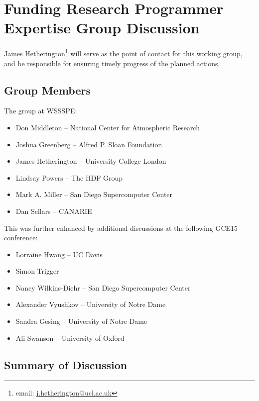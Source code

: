 \section{Funding Research Programmer Expertise Group Discussion}
\label{sec:appendix_funding_spec_expert}

James Hetherington\footnote{email:
\href{mailto:j.hetherington@ucl.ac.uk}{j.hetherington@ucl.ac.uk}} will serve as
the point of contact for this working group, and be responsible for ensuring
timely progress of the planned actions.

\subsection{Group Members}

The group at WSSSPE:

\begin{itemize}
\item Don Middleton -- National Center for Atmospheric Research
\item Joshua Greenberg -- Alfred P. Sloan Foundation
\item James Hetherington -- University College London
\item Lindsay Powers -- The HDF Group
\item Mark A. Miller -- San Diego Supercomputer Center
\item Dan Sellars -- CANARIE
\end{itemize}

This was further enhanced by additional discussions at the following
GCE15 conference:
  
\begin{itemize}
\item Lorraine Hwang -- UC Davis
\item Simon Trigger 
\item Nancy Wilkins-Diehr -- San Diego Supercomputer Center
\item Alexander Vyushkov -- University of Notre Dame
\item Sandra Gesing -- University of Notre Dame
\item Ali Swanson -- University of Oxford

\end{itemize}

\subsection{Summary of Discussion}

